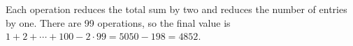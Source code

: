 Each operation reduces the total sum by two and reduces the number of entries by one. There are 99 operations, so the final value is $1+2+\cdots+100-2\cdot99=5050-198=\boxed{4852}$.
